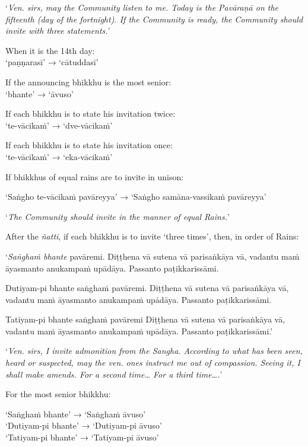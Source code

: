 ‘\emph{Ven. sirs, may the Community listen to me. Today is the Pavāraṇā on the
  fifteenth (day of the fortnight). If the Community is ready, the Community
  should invite with three statements.}’


When it is the 14th day:\\
‘paṇṇarasī’ → ‘cātuddasī’

If the announcing bhikkhu is the most senior:\\
‘bhante’ → ‘āvuso’

If each bhikkhu is to state his invitation twice:\\
‘te-vācikaṁ’ → ‘dve-vācikaṁ’

If each bhikkhu is to state his invitation once:\\
‘te-vācikaṁ’ → ‘eka-vācikaṁ’

If bhikkhus of equal rains are to invite in unison:

‘Saṅgho te-vācikaṁ pavāreyya’ → ‘Saṅgho samāna-vassikaṁ pavāreyya’

‘\emph{The Community should invite in the manner of equal Rains.}’

After the \emph{ñatti}, if each bhikkhu is to invite ‘three times’, then, in
order of Rains:

\vspace*{\parskip}

\begin{paritta}
‘\emph{Saṅghaṁ bhante} pavāremi. Diṭṭhena vā sutena vā parisaṅkāya vā, vadantu
maṁ āyasmanto anukampaṁ upādāya. Passanto paṭikkarissāmi.

Dutiyam-pi bhante saṅghaṁ pavāremi. Diṭṭhena vā sutena vā parisaṅkāya vā,
vadantu maṁ āyasmanto anukampaṁ upādāya. Passanto paṭikkarissāmi.

Tatiyam-pi bhante saṅghaṁ pavāremi Diṭṭhena vā sutena vā parisaṅkāya vā, vadantu
maṁ āyasmanto anukampaṁ upādāya. Passanto paṭikkarissāmi.’
\end{paritta}

‘\emph{Ven. sirs, I invite admonition from the Sangha. According to what has
  been seen, heard or suspected, may the ven. ones instruct me out of
  compassion. Seeing it, I shall make amends. For a second time… For a third
  time….}’

For the most senior bhikkhu:

‘Saṅghaṁ bhante’ → ‘Saṅghaṁ āvuso’\\
‘Dutiyam-pi bhante’ → ‘Dutiyam-pi āvuso’\\
‘Tatiyam-pi bhante’ → ‘Tatiyam-pi āvuso’

